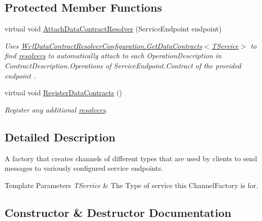 \subsection*{Protected Member Functions}
\begin{DoxyCompactItemize}
\item 
virtual void \hyperlink{classCqrs_1_1Services_1_1ServiceChannelFactory_a90572d83f68b4ba72687bb8c755b0845_a90572d83f68b4ba72687bb8c755b0845}{Attach\+Data\+Contract\+Resolver} (Service\+Endpoint endpoint)
\begin{DoxyCompactList}\small\item\em Uses \hyperlink{classCqrs_1_1Services_1_1WcfDataContractResolverConfiguration_a7e9e65b16d8f64da60e160ce60628e90_a7e9e65b16d8f64da60e160ce60628e90}{Wcf\+Data\+Contract\+Resolver\+Configuration.\+Get\+Data\+Contracts$<$\+T\+Service$>$} to find \hyperlink{}{resolvers} to automatically attach to each Operation\+Description in Contract\+Description.\+Operations of Service\+Endpoint.\+Contract of the provided {\itshape endpoint} . \end{DoxyCompactList}\item 
virtual void \hyperlink{classCqrs_1_1Services_1_1ServiceChannelFactory_a0ef5c8298659383821b3b8901351db42_a0ef5c8298659383821b3b8901351db42}{Register\+Data\+Contracts} ()
\begin{DoxyCompactList}\small\item\em Register any additional \hyperlink{}{resolvers}. \end{DoxyCompactList}\end{DoxyCompactItemize}


\subsection{Detailed Description}
A factory that creates channels of different types that are used by clients to send messages to variously configured service endpoints. 


\begin{DoxyTemplParams}{Template Parameters}
{\em T\+Service} & The Type of service this Channel\+Factory is for.\\
\hline
\end{DoxyTemplParams}


\subsection{Constructor \& Destructor Documentation}
\mbox{\label{classCqrs_1_1Services_1_1ServiceChannelFactory_a8b483162bcc271fa8212c72e13e28f55_a8b483162bcc271fa8212c72e13e28f55}} 
